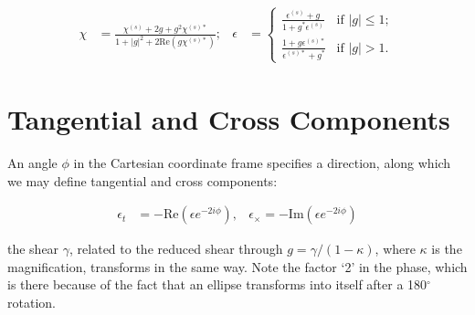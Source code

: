 \documentclass{article}
\begin{document}
\begin{align}
    \chi &= \frac{\chi^{(s)} + 2g + g^2\chi^{(s)*}}{1 + |g|^2 + 2 \text{Re}(g\chi^{(s)*})}; &  \epsilon & = \begin{cases}
        \frac{\epsilon^{(s)} + g}{1 + g^* \epsilon^{(s)}} & \text{if } |g| \leq 1; \\
        \frac{1 + g\epsilon^{(s)*}}{\epsilon^{(s)*} + g^*} & \text{if } |g| > 1.
    \end{cases}
\end{align}

\section{Tangential and Cross Components}

An angle $\phi$ in the Cartesian coordinate frame specifies a direction, along which we may define tangential and cross components:

\begin{align}
    \epsilon_t &= - \text{Re} (\epsilon e^{-2i\phi}), & \epsilon_\times = - \text{Im} (\epsilon e^{-2i\phi})
\end{align}

\noindent the shear $\gamma$, related to the reduced shear through $g = \gamma / (1 - \kappa)$, where $\kappa$ is the magnification, transforms in the same way. Note the factor `2' in the phase, which is there because of the fact that an ellipse transforms into itself after a 180$^\circ$ rotation.
\end{document}
